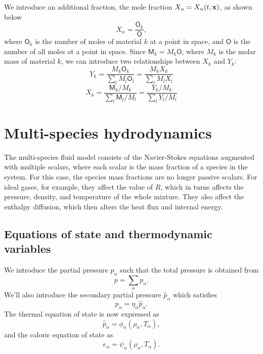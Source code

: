 \documentclass[oneside,a4paper,11pt]{report}
\begin{document}
We introduce an additional fraction, the mole fraction $X_\alpha = X_\alpha(t,\mathbf{x})$, as shown below
\begin{equation}
    X_\alpha = \frac{\mathsf{O}_k}{\mathsf{O}},
\end{equation}
where $\mathsf{O}_k$ is the number of moles of material $k$ at a point in space, and $\mathsf{O}$ is the number of all moles at a point in space. Since $\mathsf{M}_k = M_k \mathsf{O}$, where $M_k$ is the molar mass of material $k$, we can introduce two relationships between $X_k$ and $Y_k$:
\begin{equation}
\label{eq:y_intermsof_x}
    Y_k = \frac{M_k \mathsf{O}_k}{\sum_l M_l \mathsf{O}_l} = \frac{M_k X_k}{\sum_l M_l X_l}
\end{equation}
\begin{equation}
\label{eq:x_intermsof_y}
    X_k = \frac{\mathsf{M}_k / M_k}{\sum_l \mathsf{M}_l / M_l} =  \frac{Y_k / M_k}{ \sum_l Y_l / M_l}
\end{equation}


\section{Multi-species hydrodynamics}
\label{sec:multi_species_hydro}
The multi-species fluid model consists of the Navier-Stokes equations augmented with multiple scalars, where each scalar is the mass fraction of a species in the system. For this case, the species mass fractions are no longer passive scalars. For ideal gases, for example, they affect the value of $R$, which in turns affects the pressure, density, and temperature of the whole mixture. They also affect the enthalpy diffusion, which then alters the heat flux and internal energy. 

\subsection{Equations of state and thermodynamic variables}
We introduce the partial pressure $p_\alpha$ such that the total pressure is obtained from
\begin{equation}
    p = \sum_\alpha p_\alpha.
\end{equation} 
We'll also introduce the secondary partial pressure $\hat{p}_\alpha$ which satisfies
\begin{equation}
    p_\alpha = \eta_\alpha \hat{p}_\alpha.
\end{equation}
The thermal equation of state is now expressed as
\begin{equation}
    \label{eq:multi_species_thermal_eos}
    \hat{p}_\alpha = \phi_\alpha (\rho_\alpha, T_\alpha),
\end{equation}
and the caloric equation of state as
\begin{equation}
    \label{eq:multi_species_caloric_eos}
    e_\alpha = \psi_\alpha (\rho_\alpha, T_\alpha).
\end{equation}
\end{document}

